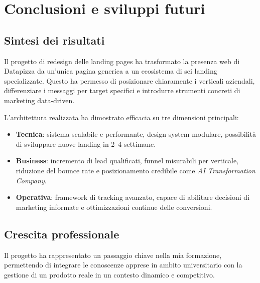\chapter{Conclusioni e sviluppi futuri}

\section{Sintesi dei risultati}
Il progetto di redesign delle landing pages ha trasformato la presenza web di Datapizza
da un'unica pagina generica a un ecosistema di sei landing specializzate. 
Questo ha permesso di posizionare chiaramente i verticali aziendali, differenziare i messaggi
per target specifici e introdurre strumenti concreti di marketing data-driven.

L'architettura realizzata ha dimostrato efficacia su tre dimensioni principali:
\begin{itemize}
  \item \textbf{Tecnica}: sistema scalabile e performante, design system modulare, 
        possibilità di sviluppare nuove landing in 2--4 settimane.
  \item \textbf{Business}: incremento di lead qualificati, funnel misurabili per verticale,
        riduzione del bounce rate e posizionamento credibile come \textit{AI Transformation Company}.
  \item \textbf{Operativa}: framework di tracking avanzato, capace di abilitare decisioni di marketing informate
        e ottimizzazioni continue delle conversioni.
\end{itemize}

\section{Crescita professionale}
Il progetto ha rappresentato un passaggio chiave nella mia formazione,
permettendo di integrare le conoscenze apprese in ambito universitario con la gestione
di un prodotto reale in un contesto dinamico e competitivo.

